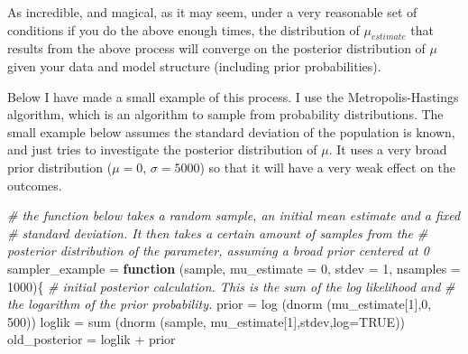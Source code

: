 \documentclass[
]{book}
\newenvironment{Shaded}{\begin{snugshade}}{\end{snugshade}}
\newcommand{\AttributeTok}[1]{\textcolor[rgb]{0.77,0.63,0.00}{#1}}
\newcommand{\CommentTok}[1]{\textcolor[rgb]{0.56,0.35,0.01}{\textit{#1}}}
\newcommand{\ConstantTok}[1]{\textcolor[rgb]{0.00,0.00,0.00}{#1}}
\newcommand{\ControlFlowTok}[1]{\textcolor[rgb]{0.13,0.29,0.53}{\textbf{#1}}}
\newcommand{\DecValTok}[1]{\textcolor[rgb]{0.00,0.00,0.81}{#1}}
\newcommand{\FunctionTok}[1]{\textcolor[rgb]{0.00,0.00,0.00}{#1}}
\newcommand{\NormalTok}[1]{#1}
\newcommand{\OtherTok}[1]{\textcolor[rgb]{0.56,0.35,0.01}{#1}}
\newcommand{\SpecialCharTok}[1]{\textcolor[rgb]{0.00,0.00,0.00}{#1}}
\begin{document}
As incredible, and magical, as it may seem, under a very reasonable set of conditions if you do the above enough times, the distribution of \(\mu_{estimate}\) that results from the above process will converge on the posterior distribution of \(\mu\) given your data and model structure (including prior probabilities).

Below I have made a small example of this process. I use the Metropolis-Hastings algorithm, which is an algorithm to sample from probability distributions. The small example below assumes the standard deviation of the population is known, and just tries to investigate the posterior distribution of \(\mu\). It uses a very broad prior distribution (\(\mu = 0\), \(\sigma = 5000\)) so that it will have a very weak effect on the outcomes.

\begin{Shaded}
\begin{Highlighting}[]
\CommentTok{\# the function below takes a random sample, an initial mean estimate and a fixed}
\CommentTok{\# standard deviation. It then takes a certain amount of samples from the }
\CommentTok{\# posterior distribution of the parameter, assuming a broad prior centered at 0}
\NormalTok{sampler\_example }\OtherTok{=} \ControlFlowTok{function}\NormalTok{ (sample, }\AttributeTok{mu\_estimate =} \DecValTok{0}\NormalTok{, }\AttributeTok{stdev =} \DecValTok{1}\NormalTok{, }\AttributeTok{nsamples =} \DecValTok{1000}\NormalTok{)\{}
  \CommentTok{\# initial posterior calculation. This is the sum of the log likelihood and}
  \CommentTok{\# the logarithm of the prior probability.}
\NormalTok{  prior }\OtherTok{=} \FunctionTok{log}\NormalTok{ (}\FunctionTok{dnorm}\NormalTok{ (mu\_estimate[}\DecValTok{1}\NormalTok{],}\DecValTok{0}\NormalTok{, }\DecValTok{500}\NormalTok{))}
\NormalTok{  loglik }\OtherTok{=} \FunctionTok{sum}\NormalTok{ (}\FunctionTok{dnorm}\NormalTok{ (sample, mu\_estimate[}\DecValTok{1}\NormalTok{],stdev,}\AttributeTok{log=}\ConstantTok{TRUE}\NormalTok{))}
\NormalTok{  old\_posterior }\OtherTok{=}\NormalTok{ loglik }\SpecialCharTok{+}\NormalTok{ prior}
  

\end{Highlighting}
\end{Shaded}
\end{document}
